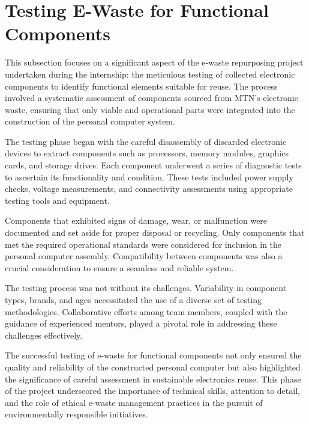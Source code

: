 \section{Testing E-Waste for Functional Components}

This subsection focuses on a significant aspect of the e-waste repurposing project undertaken during the internship: the meticulous testing of collected electronic components to identify functional elements suitable for reuse. The process involved a systematic assessment of components sourced from MTN's electronic waste, ensuring that only viable and operational parts were integrated into the construction of the personal computer system.

The testing phase began with the careful disassembly of discarded electronic devices to extract components such as processors, memory modules, graphics cards, and storage drives. Each component underwent a series of diagnostic tests to ascertain its functionality and condition. These tests included power supply checks, voltage measurements, and connectivity assessments using appropriate testing tools and equipment.

Components that exhibited signs of damage, wear, or malfunction were documented and set aside for proper disposal or recycling. Only components that met the required operational standards were considered for inclusion in the personal computer assembly. Compatibility between components was also a crucial consideration to ensure a seamless and reliable system.

The testing process was not without its challenges. Variability in component types, brands, and ages necessitated the use of a diverse set of testing methodologies. Collaborative efforts among team members, coupled with the guidance of experienced mentors, played a pivotal role in addressing these challenges effectively.

The successful testing of e-waste for functional components not only ensured the quality and reliability of the constructed personal computer but also highlighted the significance of careful assessment in sustainable electronics reuse. This phase of the project underscored the importance of technical skills, attention to detail, and the role of ethical e-waste management practices in the pursuit of environmentally responsible initiatives.
